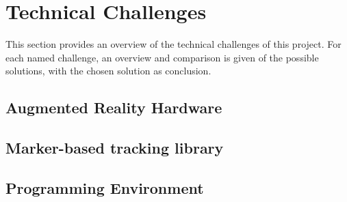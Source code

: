 \chapter{Technical Challenges} \label{ch:technicalchallenges}
	This section provides an overview of the technical challenges of 
	this project. For each named challenge, an overview and comparison is 
	given of the possible solutions, with the chosen solution as conclusion.
	
	\section{Augmented Reality Hardware} \label{sec:arhardware}
	
	\section{Marker-based tracking library} \label{sec:trackinglib}
	
	\section{Programming Environment} \label{sec:programmingenvironment}
	
